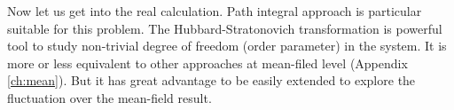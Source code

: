 %
% 
%

Now let us get into the real calculation.  Path integral approach is particular suitable for this problem.   The Hubbard-Stratonovich transformation is powerful tool to study non-trivial degree of freedom (order parameter) in the system.  It is more or less equivalent to other approaches at mean-filed level (Appendix \ref{ch:mean}). But it has great advantage to be easily extended to explore the fluctuation over the mean-field result.  

